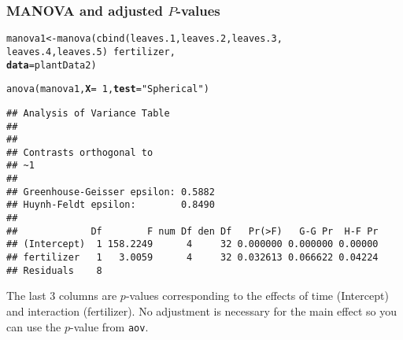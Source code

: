 \documentclass[color=usenames,dvipsnames]{beamer}\usepackage[]{graphicx}\usepackage[]{color}
\makeatletter
\newcommand{\hlnum}[1]{\textcolor[rgb]{0.69,0.494,0}{#1}}%
\newcommand{\hlstr}[1]{\textcolor[rgb]{0.749,0.012,0.012}{#1}}%
\newcommand{\hlopt}[1]{\textcolor[rgb]{0,0,0}{#1}}%
\newcommand{\hlstd}[1]{\textcolor[rgb]{0,0,0}{#1}}%
\newcommand{\hlkwb}[1]{\textcolor[rgb]{0,0.341,0.682}{#1}}%
\newcommand{\hlkwc}[1]{\textcolor[rgb]{0,0,0}{\textbf{#1}}}%
\newcommand{\hlkwd}[1]{\textcolor[rgb]{0.004,0.004,0.506}{#1}}%
\newenvironment{kframe}{%
 \def\at@end@of@kframe{}%
 \ifinner\ifhmode%
  \def\at@end@of@kframe{\end{minipage}}%
  \begin{minipage}{\columnwidth}%
 \fi\fi%
 \def\FrameCommand##1{\hskip\@totalleftmargin \hskip-\fboxsep
 \colorbox{shadecolor}{##1}\hskip-\fboxsep
     \hskip-\linewidth \hskip-\@totalleftmargin \hskip\columnwidth}%
 \MakeFramed {\advance\hsize-\width
   \@totalleftmargin\z@ \linewidth\hsize
   \@setminipage}}%
 {\par\unskip\endMakeFramed%
 \at@end@of@kframe}
\newenvironment{knitrout}{}{} %
\newcommand{\inr}[1]{\colorbox{inlinecolor}{\texttt{#1}}}
\makeatother
\begin{document}
\begin{frame}[fragile]
  \frametitle{MANOVA and adjusted $P$-values}
  \scriptsize %
\begin{knitrout}\scriptsize
{}\color{fgcolor}\begin{kframe}
\begin{alltt}
\hlstd{manova1} \hlkwb{<-} \hlkwd{manova}\hlstd{(}\hlkwd{cbind}\hlstd{(leaves.1, leaves.2, leaves.3,}
                        \hlstd{leaves.4, leaves.5)} \hlopt{~} \hlstd{fertilizer,}
                  \hlkwc{data}\hlstd{=plantData2)}
\end{alltt}
\end{kframe}
\end{knitrout}
\pause
\begin{knitrout}\scriptsize
{}\color{fgcolor}\begin{kframe}
\begin{alltt}
\hlkwd{anova}\hlstd{(manova1,} \hlkwc{X}\hlstd{=}\hlopt{~}\hlnum{1}\hlstd{,} \hlkwc{test}\hlstd{=}\hlstr{"Spherical"}\hlstd{)}
\end{alltt}
\begin{verbatim}
## Analysis of Variance Table
## 
## 
## Contrasts orthogonal to
## ~1
## 
## Greenhouse-Geisser epsilon: 0.5882
## Huynh-Feldt epsilon:        0.8490
## 
##             Df        F num Df den Df   Pr(>F)   G-G Pr  H-F Pr
## (Intercept)  1 158.2249      4     32 0.000000 0.000000 0.00000
## fertilizer   1   3.0059      4     32 0.032613 0.066622 0.04224
## Residuals    8
\end{verbatim}
\end{kframe}
\end{knitrout}
\pause
\footnotesize
{%
  The last 3 columns are $p$-values corresponding to the effects of time
  (Intercept) and interaction (fertilizer).
  No adjustment is necessary
  for the main effect so you can use the $p$-value from \inr{aov}. 
  \par}
\end{frame}
\end{document}
